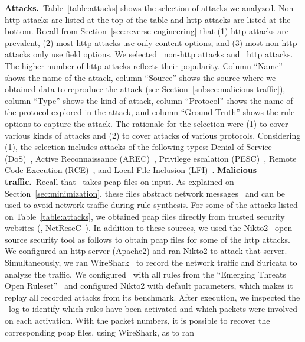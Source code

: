 \documentclass[conference]{IEEEtran}
\begin{document}
\noindent\textbf{Attacks.}~Table~\ref{table:attacks} shows the selection
of attacks we analyzed.  Non-http attacks are listed at the top of the
table and http attacks are listed at the bottom. Recall from
Section~\ref{sec:reverse-engineering} that (1) http attacks are
prevalent, (2) most http attacks use only content options, and (3)
most non-http attacks only use field options. We selected
\numNonContentAttacks\ non-http attacks and \numContentAttacks\ http
attacks. The higher number of http attacks reflects their
popularity. Column ``Name'' shows the name of the attack, column
``Source'' shows the source where we obtained data to reproduce the
attack (see Section~\ref{subsec:malicious-traffic}), column ``Type''
shows the kind of attack, column ``Protocol'' shows the name of the
protocol explored in the attack, and column ``Ground Truth'' shows the
rule options to capture the attack. The rationale for the selection
were (1) to cover various kinds of attacks and (2) to cover attacks of
various protocols. Considering (1), the selection includes attacks of
the following types: Denial-of-Service (DoS)~\cite{denial-of-service},
Active Reconnaissance (AREC)~\cite{active-reconnaissance}, Privilege
escalation (PESC)~\cite{privilege-escalation}, Remote Code Execution
(RCE)~\cite{remote-code-execution}, and Local File Inclusion
(LFI)~\cite{local-file-inclusion}.
\noindent\textbf{Malicious traffic.}~Recall that \tname\ takes
pcap files on input. As explained on Section~\ref{sec:minimization},
these files abstract network messages~\cite{pcap} and can be used to
avoid network traffic during rule synthesis. For some of the attacks
listed on Table~\ref{table:attacks}, we obtained pcap files directly
from trusted security websites (\eg{},
NetReseC~\cite{pcap-attacks}). In addition to these sources, we used
the Nikto2~\cite{nikto} open source security tool as follows to obtain
pcap files for some of the http attacks. We configured an http server
(Apache2) and ran Nikto2 to attack that server. Simultaneously, we ran
WireShark~\cite{wireshark-net-monitor} to record the network traffic
and Suricata to analyze the traffic. We configured \suri\ with all
rules from the ``Emerging Threats Open
Ruleset''~\cite{emerging-threats-open} and configured Nikto2 with
default parameters, which makes it replay all recorded attacks from
its benchmark. After execution, we inspected the \suri\ log to
identify which rules have been activated and which packets were
involved on each activation. With the packet numbers, it is possible
to recover the corresponding pcap files, using WireShark, as to ran
\end{document}
